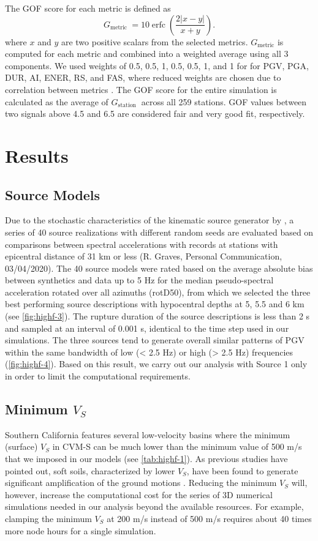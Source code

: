 The GOF score for each metric is defined as
\begin{equation}\label{qe:highf-4}
  G_{\text {metric }}=10 \operatorname{erfc}\left(\dfrac{2|x-y|}{x+y}\right).
\end{equation}
\noindent where $x$ and $y$ are two positive scalars from the selected metrics. $G_{\text {metric}}$ is computed for each metric and combined into a weighted average using all 3 components. We used weights of 0.5, 0.5, 1, 0.5, 0.5, 1, and 1 for for PGV, PGA, DUR, AI, ENER, RS, and FAS, where reduced weights are chosen due to correlation between metrics \citep{olsenGoodnessoffitCriteriaBroadband2010}. The GOF score for the entire simulation is calculated as the average of $G_{\text {station }}$ across all 259 stations. GOF values between two signals above 4.5 and 6.5 are considered fair and very good fit, respectively.

\section{Results}
\subsection{Source Models}
Due to the stochastic characteristics of the kinematic source generator by \citet{gravesKinematicGroundMotion2016}, a series of 40 source realizations with different random seeds are evaluated based on comparisons between spectral accelerations with records at stations with epicentral distance of 31 km or less (R. Graves, Personal Communication, 03/04/2020). The 40 source models were rated based on the average absolute bias between synthetics and data up to 5 Hz for the median pseudo-spectral acceleration rotated over all azimuths (rotD50), from which we selected the three best performing source descriptions with hypocentral depths at 5, 5.5 and 6 km (see \cref{fig:highf-3}). The rupture duration of the source descriptions is less than 2 s and sampled at an interval of 0.001 s, identical to the time step used in our simulations. The three sources tend to generate overall similar patterns of PGV within the same bandwidth of low (< 2.5 Hz) or high (> 2.5 Hz) frequencies (\cref{fig:highf-4}). Based on this result, we carry out our analysis with Source 1 only in order to limit the computational requirements.

\subsection{Minimum \textbf{$V_S$}}
Southern California features several low-velocity basins where the minimum (surface) $V_S$ in CVM-S can be much lower than the minimum value of 500 m/s that we imposed in our models (see \cref{tab:highf-1}). As previous studies have pointed out, soft soils, characterized by lower $V_S$, have been found to generate significant amplification of the ground motions . Reducing the minimum $V_S$ will, however, increase the computational cost for the series of 3D numerical simulations needed in our analysis beyond the available resources. For example, clamping the minimum $V_S$ at 200 m/s instead of 500 m/s requires about 40 times more node hours for a single simulation. 

